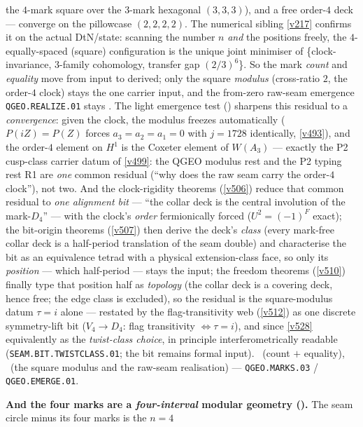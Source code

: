 \documentclass[11pt,a4paper]{article}
\begin{document}
\begin{keybox}
the $4$-mark square over the $3$-mark hexagonal $(3,3,3)$), and a free order-$4$ deck --- converge on the
pillowcase $(2,2,2,2)$. The numerical sibling \vref{v217} confirms it on the actual DtN/state: scanning the
number $n$ \emph{and} the positions freely, the $4$-equally-spaced (square) configuration is the unique joint
minimiser of \{clock-invariance, $3$-family cohomology, transfer gap $(2/3)^6$\}. So the mark \emph{count}
and \emph{equality} move from input to derived; only the square \emph{modulus} (cross-ratio $2$, the order-$4$
clock) stays the one carrier input, and the from-zero raw-seam emergence \texttt{QGEO.REALIZE.01} stays \mO.
The light emergence test () sharpens this residual to a
\emph{convergence}: given the clock, the modulus freezes automatically ($P(iZ)=P(Z)$ forces
$a_3=a_2=a_1=0$ with $j=1728$ identically, \vref{v493}), and the order-$4$ element on $H^1$ is the
Coxeter element of $W(A_3)$ --- exactly the P2 cusp-class carrier datum of \vref{v499}: the QGEO
modulus rest and the P2 typing rest R1 are \emph{one} common residual (``why does the raw seam carry
the order-$4$ clock''), not two. And the clock-rigidity theorems (\vref{v506}) reduce that common
residual to \emph{one alignment bit} --- ``the collar deck is the central involution of the
mark-$D_4$'' --- with the clock's \emph{order} fermionically forced ($U^2=(-1)^F$ exact); the
bit-origin theorems (\vref{v507}) then derive the deck's \emph{class} (every mark-free collar deck
is a half-period translation of the seam double) and characterise the bit as an equivalence tetrad
with a physical extension-class face, so only its \emph{position} --- which half-period --- stays
the input; the freedom theorems (\vref{v510}) finally type that position half as \emph{topology}
(the collar deck is a covering deck, hence free; the edge class is excluded), so the residual is the
square-modulus datum $\tau=i$ alone --- restated by the flag-transitivity web (\vref{v512}) as one
discrete symmetry-lift bit ($V_4\to D_4$: flag transitivity $\iff\tau=i$), and since \vref{v528}
equivalently as the \emph{twist-class choice}, in principle interferometrically readable
(\texttt{SEAM.BIT.TWISTCLASS.01}; the bit remains formal input).
\mE\ (count $+$ equality), \mO\ (the square modulus and the raw-seam realisation) --- \texttt{QGEO.MARKS.03} /
\texttt{QGEO.EMERGE.01}.
\par\smallskip\noindent\textbf{And the four marks are a \emph{four-interval} modular geometry
().} The seam circle minus its four marks is the $n{=}4$

\end{keybox}
\end{document}
